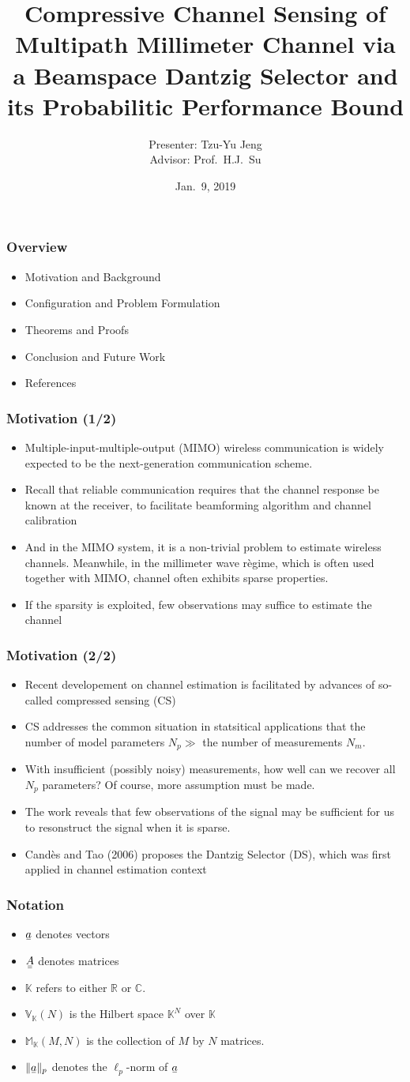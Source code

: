 \documentclass{beamer}
\title{Compressive Channel Sensing of Multipath Millimeter Channel via a Beamspace Dantzig Selector and its Probabilitic Performance Bound}
\author{Presenter: Tzu-Yu Jeng \\ Advisor: Prof.\ H.J.\ Su}
\date{Jan.\ 9, 2019}
\institute{Graduate Instute of Commnication Engineering, NTU}
\newcommand{\I}{\item}
\newcommand{\MB}[1]{\mathbb{#1}}
\newcommand{\V}[1]{\stackunder[1.2pt]{$#1$}{\rule{.9ex}{.075ex}}}
\newcommand{\M}[1]{\V{\V{#1}}}
\begin{document}
 
\frame{\titlepage}
 
\begin{frame}
\frametitle{Overview}
\begin{itemize}
\I Motivation and Background 
\I Configuration and Problem Formulation
\I Theorems and Proofs
\I Conclusion and Future Work
\I References
\end{itemize}
\end{frame}

\begin{frame}
\frametitle{Motivation (1/2)}
\begin{itemize}
\I Multiple-input-multiple-output (MIMO) wireless communication is widely expected to be the next-generation communication scheme.
\I Recall that reliable communication requires that the channel response be known at the receiver, to facilitate beamforming algorithm and channel calibration
\I And in the MIMO system, it is a non-trivial problem to estimate wireless channels.
Meanwhile, in the millimeter wave r\`egime, which is often used together with MIMO, channel often exhibits sparse properties.
\I If the sparsity is exploited, few observations may suffice to estimate the channel
\end{itemize}
\end{frame}

\begin{frame}
\frametitle{Motivation (2/2)}
\begin{itemize}
\I Recent developement on channel estimation is facilitated by advances of so-called compressed sensing (CS)
\I CS addresses the common situation in statsitical applications that the number of model parameters \(N_p \gg\) the number of measurements \(N_m\).
\I With insufficient (possibly noisy) measurements, how well can we recover all \(N_p\) parameters?
Of course, more assumption must be made.
\I The work reveals that few observations of the signal may be sufficient for us to resonstruct the signal when it is sparse.
\I Cand\`es and Tao (2006) proposes the Dantzig Selector (DS), which was first applied in channel estimation context
\end{itemize}
\end{frame}

\begin{frame}
\frametitle{Notation}
\begin{itemize}
\I \(\V{a}\) denotes vectors
\I \(\M{A}\) denotes matrices
\I \(\MB{K}\) refers to either \(\MB{R}\) or \(\MB{C}\).
\I \(\MB{V}_{\MB{K}} (N)\) is the Hilbert space \(\MB{K}^N\) over \(\MB{K}\)
\I \(\MB{M}_{\MB{K}} (M,N)\) is the collection of \(M\) by \(N\) matrices.
\I \(\|\V{a}\|_p\) denotes the \(\ell_p\)-norm of \(\V{a}\)
\end{itemize}
\end{frame}
\end{document}
